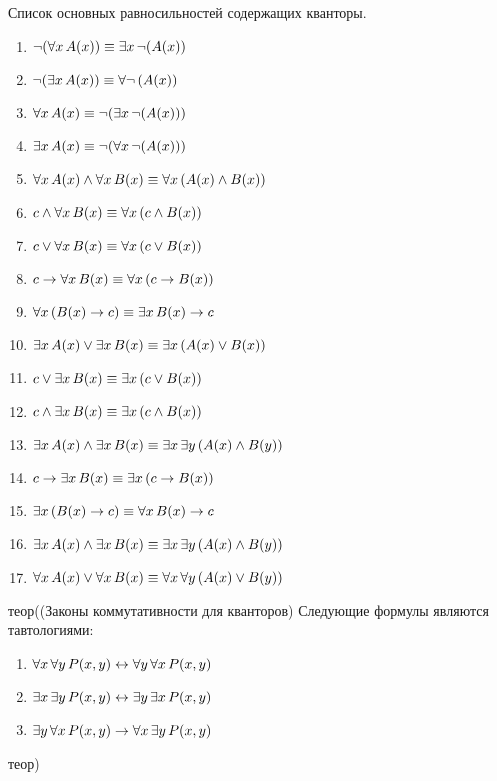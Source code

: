 \documentclass[letterpaper, 10pt]{article}
\theoremstyle{definition}
\begin{document}
	Список основных равносильностей содержащих кванторы.
	\begin{enumerate}
		\item $\lnot (\forall x\, A(x)) \equiv \exists x\, \lnot (A(x))$
		\item $\lnot (\exists x\, A(x)) \equiv \forall \lnot\, (A(x))$
		\item $\forall x\, A(x) \equiv \lnot (\exists x\, \lnot (A(x)))$
		\item $\exists x\, A(x) \equiv \lnot (\forall x\, \lnot (A(x)))$
		\item $\forall x\, A(x) \land \forall x\, B(x) \equiv \forall x\,(A(x) \land B(x))$
		\item $c \land \forall x\, B(x) \equiv \forall x\, (c \land B(x))$
		\item $c \lor \forall x\, B(x) \equiv \forall x\, (c \lor B(x))$
		\item $c \rightarrow \forall x\, B(x) \equiv \forall x\, (c \rightarrow B(x))$
		\item $\forall x\, (B(x) \rightarrow c) \equiv \exists x\, B(x) \rightarrow c$
		\item $\exists x\, A(x) \lor \exists x\, B(x) \equiv \exists x\,(A(x) \lor B(x))$
		\item $c \lor \exists x\, B(x) \equiv \exists x\, (c \lor B(x))$
		\item $c \land \exists x\, B(x) \equiv \exists x\, (c \land B(x))$
		\item $\exists x\, A(x) \land \exists x\, B(x) \equiv \exists x\, \exists y\, (A(x) \land B(y))$
		\item $c \rightarrow \exists x\, B(x) \equiv \exists x\, (c \rightarrow B(x))$
		\item $\exists x\, (B(x) \rightarrow c) \equiv \forall x\, B(x) \rightarrow c$
		\item $\exists x\, A(x) \land \exists x\, B(x) \equiv \exists x\, \exists y\, (A(x) \land B(y))$
		\item $\forall x\, A(x) \lor \forall x\, B(x) \equiv \forall x\, \forall y\,
			(A(x) \lor B(y))$
	\end{enumerate}

	теор((Законы коммутативности для кванторов)
	Следующие формулы являются тавтологиями:
	\begin{enumerate}
		\item $\forall x\, \forall y\, P(x,y) \leftrightarrow \forall y\, \forall x\, P(x,y)$
		\item $\exists x\, \exists y\, P(x,y) \leftrightarrow \exists y\, \exists x\, P(x,y)$
		\item $\exists y\, \forall x\, P(x,y) \rightarrow \forall x\, \exists y\,
			P(x,y)$
	\end{enumerate}
	теор)
\end{document}

